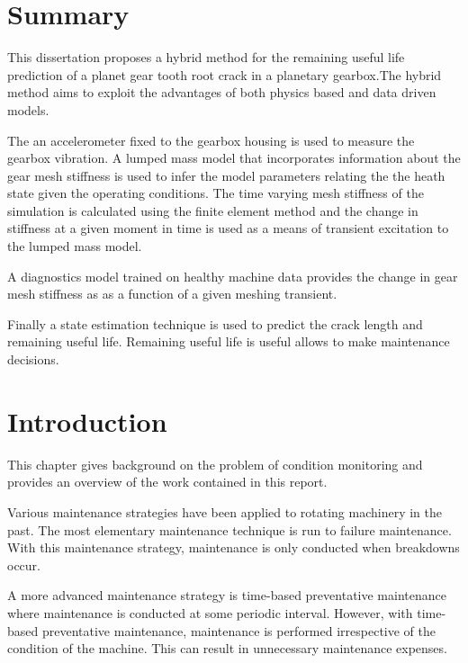 \newpage

\chapter*{Summary}

This dissertation proposes a hybrid method for the remaining useful life prediction of a planet gear tooth root crack in a planetary gearbox.The hybrid method aims to exploit the advantages of both physics based and data driven models.

The an accelerometer fixed to the gearbox housing is used to measure the gearbox vibration. A lumped mass model that incorporates information about the gear mesh stiffness is used to infer the model parameters relating the the heath state given the operating conditions. The time varying mesh stiffness of the simulation is calculated using the finite element method and the change in stiffness at a given moment in time is used as a means of transient excitation to the lumped mass model. 

A diagnostics model trained on healthy machine data provides the change in gear mesh stiffness as as a function of a given meshing transient.  

Finally a state estimation technique is used to predict the crack length and remaining useful life. Remaining useful life is useful allows to make maintenance decisions.

\chapter{Introduction}

This chapter gives background on the problem of condition monitoring and provides an overview of the work contained in this report.

Various maintenance strategies have been applied to rotating machinery in the past. The most elementary maintenance technique is run to failure maintenance. With this maintenance strategy, maintenance is only conducted when breakdowns occur.

A more advanced maintenance strategy is time-based preventative maintenance where maintenance is conducted at some periodic interval. However, with time-based preventative maintenance, maintenance is performed irrespective of the condition of the machine. This can result in unnecessary maintenance expenses. 

